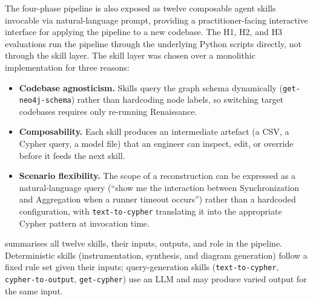 The four-phase pipeline is also exposed as twelve composable agent
skills invocable via natural-language prompt, providing a
practitioner-facing interactive interface for applying the pipeline to
a new codebase. The H1, H2, and H3 evaluations run the pipeline
through the underlying Python scripts directly, not through the skill
layer. The skill layer was chosen over a monolithic implementation for
three reasons:

\begin{itemize}
  \item \textbf{Codebase agnosticism.} Skills query the graph schema
    dynamically (\texttt{get-neo4j-schema}) rather than hardcoding node
    labels, so switching target codebases requires only re-running
    Renaissance.
  \item \textbf{Composability.} Each skill produces an intermediate
    artefact (a CSV, a Cypher query, a model file) that an engineer can
    inspect, edit, or override before it feeds the next skill.
  \item \textbf{Scenario flexibility.} The scope of a reconstruction can
    be expressed as a natural-language query (``show me the interaction
    between Synchronization and Aggregation when a runner timeout
    occurs'') rather than a hardcoded configuration, with
    \texttt{text-to-cypher} translating it into the appropriate Cypher
    pattern at invocation time.
\end{itemize}

 summarises all twelve skills, their inputs, outputs,
and role in the pipeline. Deterministic skills (instrumentation,
synthesis, and diagram generation) follow a fixed rule set given their
inputs; query-generation skills (\texttt{text-to-cypher},
\texttt{cypher-to-output}, \texttt{get-cypher}) use an LLM and may
produce varied output for the same input.

